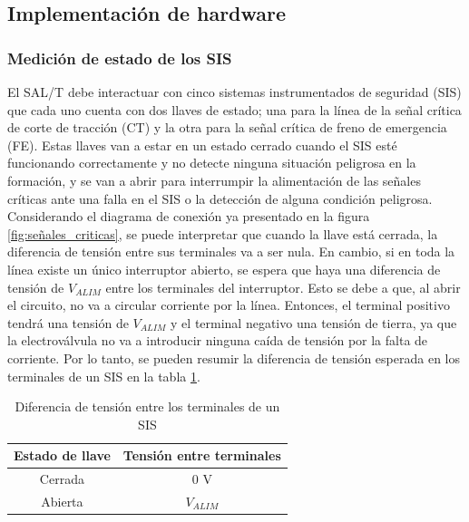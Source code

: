 \subsection{Implementación de hardware}
\subsubsection{Medición de estado de los SIS}

El SAL/T debe interactuar con cinco sistemas instrumentados de seguridad (SIS) que cada uno cuenta con dos llaves de estado; una para la línea de la señal crítica de corte de tracción (CT) y la otra para la señal crítica de freno de emergencia (FE). Estas llaves van a estar en un estado cerrado cuando el SIS esté funcionando correctamente y no detecte ninguna situación peligrosa en la formación, y se van a abrir para interrumpir la alimentación de las señales críticas ante una falla en el SIS o la detección de alguna condición peligrosa. \\ 

Considerando el diagrama de conexión ya presentado en la figura \ref{fig:señales_criticas}, se puede interpretar que cuando la llave está cerrada, la diferencia de tensión entre sus terminales va a ser nula. En cambio, si en toda la línea existe un único interruptor abierto, se espera que haya una diferencia de tensión de $V_{ALIM}$ entre los terminales del interruptor. Esto se debe a que, al abrir el circuito, no va a circular corriente por la línea. Entonces, el terminal positivo tendrá una tensión de $V_{ALIM}$ y el terminal negativo una tensión de tierra, ya que la electroválvula no va a introducir ninguna caída de tensión por la falta de corriente. Por lo tanto, se pueden resumir la diferencia de tensión esperada en los terminales de un SIS en la tabla \ref{tab:switch_state}. 

\begin{table}[htb]
    \begin{tabular}{|c|c|} 
        \hline
        \textbf{Estado de llave} & \textbf{Tensión entre terminales}\\
        \hline
        Cerrada     &     0 V   \\
        \hline
        Abierta     &     $V_{ALIM}$ \\
        \hline
    \end{tabular}
    \label{tab:switch_state}
    \caption{Diferencia de tensión entre los terminales de un SIS}
\end{table}

